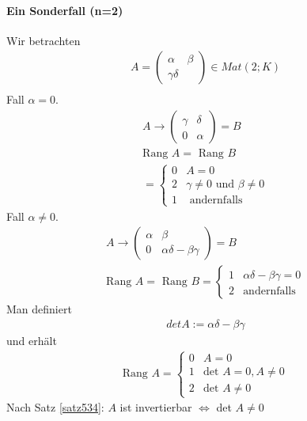 \documentclass[11pt]{report}
\begin{document}
\paragraph{Ein Sonderfall (n=2)}
Wir betrachten 
\begin{align}
A = \begin{pmatrix} \alpha & \beta \\ \gamma \delta \end{pmatrix} \in Mat(2;K) \\
\end{align}
Fall $\alpha = 0$.
\begin{align}
A \rightarrow \begin{pmatrix} \gamma & \delta \\ 0 & \alpha \end{pmatrix} = B \\
\text{Rang } A = \text{ Rang } B \\
= \left\{ \begin{matrix} 0 & A=0 \\ 2 & \gamma \neq 0 \text{ und } \beta \neq 0 \\ 1 & \text{ andernfalls}\end{matrix}\right.
\end{align}
Fall $\alpha \neq 0$.
\begin{align}
A \rightarrow \begin{pmatrix} \alpha & \beta \\ 0 & \alpha\delta - \beta \gamma\end{pmatrix} = B \\
\text{Rang } A = \text{ Rang } B = \left\{ \begin{matrix} 1 & \alpha\delta - \beta\gamma = 0 \\ 2 & \text{andernfalls} \end{matrix}\right.
\end{align}
Man definiert 
\begin{align}
 det A := \alpha \delta - \beta \gamma
\end{align}
und erhält
\begin{align}
\text{Rang } A = \left\{ \begin{matrix} 0 & A=0 \\ 1 & \text{det } A = 0, A \neq 0 \\ 2 & \text{det }A \neq 0 \end{matrix}\right.
\end{align}
Nach Satz \ref{satz534}:
$A$ ist invertierbar $\Leftrightarrow$ det $A \neq 0$
\end{document}

